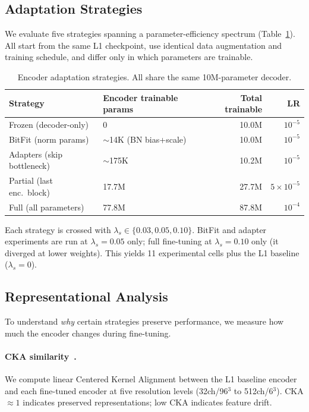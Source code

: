 \documentclass[runningheads]{llncs}
\begin{document}
\subsection{Adaptation Strategies}
\label{sec:strategies}

We evaluate five strategies spanning a parameter-efficiency spectrum (Table~\ref{tab:strategies}).
All start from the same L1 checkpoint, use identical data augmentation and training schedule, and differ only in which parameters are trainable.

\begin{table}[t]
\caption{Encoder adaptation strategies. All share the same 10M-parameter decoder.}
\label{tab:strategies}
\centering
\small
\begin{tabular}{llrr}
\toprule
Strategy & Encoder trainable params & Total trainable & LR \\
\midrule
Frozen (decoder-only)     & 0                        & 10.0M  & $10^{-5}$ \\
BitFit (norm params)      & ${\sim}$14K (BN bias+scale) & 10.0M  & $10^{-5}$ \\
Adapters (skip bottleneck)& ${\sim}$175K              & 10.2M  & $10^{-5}$ \\
Partial (last enc.\ block) & 17.7M                   & 27.7M  & $5{\times}10^{-5}$ \\
Full (all parameters)     & 77.8M                    & 87.8M  & $10^{-4}$ \\
\bottomrule
\end{tabular}
\end{table}

Each strategy is crossed with $\lambda_s \in \{0.03, 0.05, 0.10\}$.
BitFit and adapter experiments are run at $\lambda_s{=}0.05$ only; full fine-tuning at $\lambda_s{=}0.10$ only (it diverged at lower weights).
This yields 11 experimental cells plus the L1 baseline ($\lambda_s{=}0$).

\subsection{Representational Analysis}

To understand \emph{why} certain strategies preserve performance, we measure how much the encoder changes during fine-tuning.

\paragraph{CKA similarity~\cite{kornblith_cka_2019}.}
We compute linear Centered Kernel Alignment between the L1 baseline encoder and each fine-tuned encoder at five resolution levels (32ch/96$^3$ to 512ch/6$^3$).
CKA${\approx}1$ indicates preserved representations; low CKA indicates feature drift.
\end{document}
